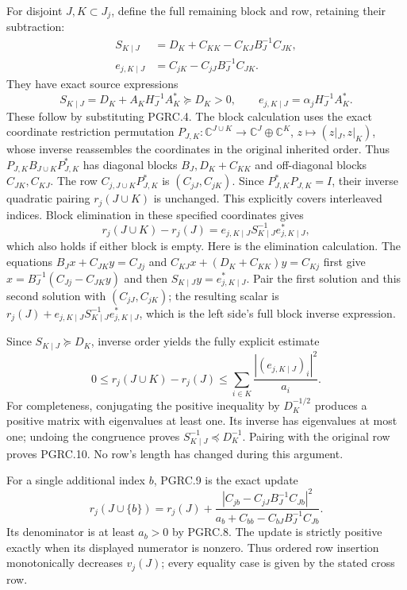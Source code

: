 For disjoint $J,K\subset J_j$, define the full remaining block
and row, retaining their subtraction:
\[
 \begin{aligned}
 S_{K\mid J}&=D_K+C_{KK}-C_{KJ}B_J^{-1}C_{JK},\\
 e_{j,K\mid J}&=C_{jK}-C_{jJ}B_J^{-1}C_{JK}.
 \end{aligned}
 \tag{PGRC.7}\label{eq:pgrc-remaining-block}
\]
They have exact source expressions
\[
 S_{K\mid J}=D_K+A_KH_J^{-1}A_K^*\succeq D_K>0,
 \qquad e_{j,K\mid J}=\alpha_jH_J^{-1}A_K^*.
 \tag{PGRC.8}\label{eq:pgrc-remaining-source}
\]
These follow by substituting PGRC.4. The block calculation uses
the exact coordinate restriction permutation
$P_{J,K}:\mathbb{C}^{J\cup K}\to\mathbb{C}^J\oplus\mathbb{C}^K$,
$z\mapsto(z|_J,z|_K)$, whose inverse reassembles the coordinates
in the original inherited order. Thus
$P_{J,K}B_{J\cup K}P_{J,K}^*$ has diagonal blocks
$B_J,D_K+C_{KK}$ and off-diagonal blocks $C_{JK},C_{KJ}$.
The row $C_{j,J\cup K}P_{J,K}^*$ is $(C_{jJ},C_{jK})$.
Since $P_{J,K}^*P_{J,K}=I$, their inverse quadratic pairing
$r_j(J\cup K)$ is unchanged. This explicitly covers interleaved
indices. Block elimination in these specified coordinates gives
\[
 r_j(J\cup K)-r_j(J)
 =e_{j,K\mid J}S_{K\mid J}^{-1}e_{j,K\mid J}^*,
 \tag{PGRC.9}\label{eq:pgrc-exact-remainder}
\]
which also holds if either block is empty. Here is the elimination
calculation. The equations
$B_Jx+C_{JK}y=C_{Jj}$ and
$C_{KJ}x+(D_K+C_{KK})y=C_{Kj}$ first give
$x=B_J^{-1}(C_{Jj}-C_{JK}y)$ and then
$S_{K\mid J}y=e_{j,K\mid J}^*$. Pair the first solution and this
second solution with $(C_{jJ},C_{jK})$; the resulting scalar is
$r_j(J)+e_{j,K\mid J}S_{K\mid J}^{-1}e_{j,K\mid J}^*$,
which is the left side's full block inverse expression.

Since $S_{K\mid J}\succeq D_K$, inverse order yields the fully
explicit estimate
\[
 0\leq r_j(J\cup K)-r_j(J)
 \leq\sum_{i\in K}\frac{|(e_{j,K\mid J})_i|^2}{a_i}.
 \tag{PGRC.10}\label{eq:pgrc-remainder-bound}
\]
For completeness, conjugating the positive inequality by
$D_K^{-1/2}$ produces a positive matrix with eigenvalues at least
one. Its inverse has eigenvalues at most one; undoing the
congruence proves $S_{K\mid J}^{-1}\preceq D_K^{-1}$.
Pairing with the original row proves PGRC.10. No row's length
has changed during this argument.

For a single additional index $b$, PGRC.9 is the exact update
\[
 r_j(J\cup\{b\})=r_j(J)+
 \frac{|C_{jb}-C_{jJ}B_J^{-1}C_{Jb}|^2}
 {a_b+C_{bb}-C_{bJ}B_J^{-1}C_{Jb}}.
 \tag{PGRC.11}\label{eq:pgrc-single-update}
\]
Its denominator is at least $a_b>0$ by PGRC.8. The update
is strictly positive exactly when its displayed numerator is
nonzero. Thus ordered row insertion monotonically decreases
$v_j(J)$; every equality case is given by the stated cross row.

